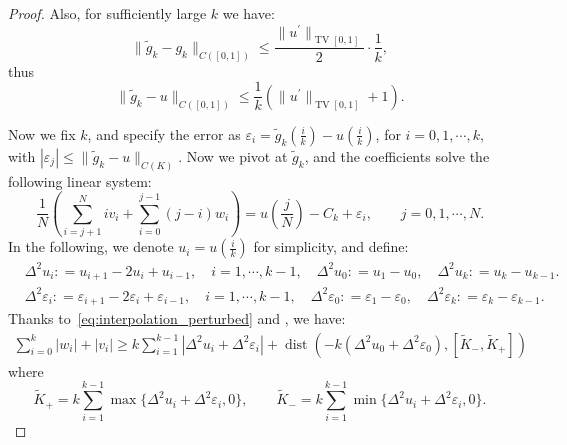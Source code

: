 \documentclass[10pt,a4paper]{amsart}
\begin{document}
\begin{proof}
Also, for sufficiently large $k$ we have:
\begin{equation}
    \|\tilde g_k-g_k\|_{C([0,1])}\le \frac{\|{u^\prime}\|_{\operatorname{TV}[0,1]}}{2} \cdot \frac{1}{k},
\end{equation}
thus
\begin{equation}
    \|\tilde g_k-u\|_{C([0,1])}\le \frac{1}{k}(\|{u^\prime}\|_{\operatorname{TV}[0,1]}+ 1).
\end{equation}


Now we fix $k$, and specify the error as
$\varepsilon_i = \tilde g_k(\frac i k)-u(\frac i k)$,
for $ i=0,1,\cdots, k,$ with  $|\varepsilon_j|\le  \|\tilde g_k-u\|_{C(K)}$.
Now we pivot at $\tilde g_k$, and the coefficients solve the following linear system:
\begin{equation}
    \label{eq:interpolation_perturbed}
    \frac{1}{N}(\sum_{i=j+1}^N iv_i+\sum_{i=0}^{j-1} (j-i)w_i)=u(\frac j N) -C_k+ \varepsilon_i, \qquad j=0,1, \cdots,N.
\end{equation}
In the following, we denote $u_i=u(\frac i k)$ for simplicity, and define:
\begin{equation}
    \begin{aligned}
            &\Delta^2 u_i: = u_{i+1}-2u_i+u_{i-1}, \quad i=1, \cdots, k-1, \quad \Delta^2 u_0: = u_1-u_0, \quad \Delta^2 u_k: = u_k-u_{k-1}.\\
            &\Delta^2 \varepsilon_i: = \varepsilon_{i+1}-2\varepsilon_i+\varepsilon_{i-1}, \quad i=1, \cdots, k-1, \quad\Delta^2 \varepsilon_0: = \varepsilon_1-\varepsilon_0, \quad \Delta^2 \varepsilon_k: = \varepsilon_k-\varepsilon_{k-1}.
    \end{aligned}
\end{equation}
Thanks to~\eqref{eq:interpolation_perturbed} and , we have:
\begin{equation}
    \label{eq:weight_sum_estimation_perturbed}
    \begin{aligned}
            \sum_{i=0}^{k} |w_i|+|v_i| \ge  k\sum_{i=1}^{k-1} |\Delta^2 u_i+\Delta^2 \varepsilon_i| + \operatorname{dist}\left( - k(\Delta^2 u_0+\Delta^2 \varepsilon_0),[\widetilde K_-, \widetilde K_+] \right)
    \end{aligned}
\end{equation}
where
\begin{equation}
    \widetilde K_+ = k \sum_{i=1}^{k-1} \max\{\Delta^2 u_i+\Delta^2 \varepsilon_i, 0\}, \qquad \widetilde K_- = k\sum_{i=1}^{k-1} \min\{\Delta^2 u_i+\Delta^2 \varepsilon_i, 0\}.
\end{equation}

\end{proof}
\end{document}
